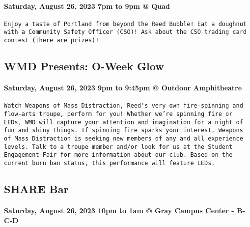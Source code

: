 \documentclass[
]{article}
\begin{document}
\hypertarget{saturday-august-26-2023-7pm-to-9pm-quad}{%
\paragraph{Saturday, August 26, 2023 7pm to 9pm @
Quad}\label{saturday-august-26-2023-7pm-to-9pm-quad}}

\begin{verbatim}
Enjoy a taste of Portland from beyond the Reed Bubble! Eat a doughnut with a Community Safety Officer (CSO)! Ask about the CSO trading card contest (there are prizes)!
\end{verbatim}

\hypertarget{wmd-presents-o-week-glow}{%
\subsection{WMD Presents: O-Week Glow}\label{wmd-presents-o-week-glow}}

\hypertarget{saturday-august-26-2023-9pm-to-945pm-outdoor-amphitheatre}{%
\paragraph{Saturday, August 26, 2023 9pm to 9:45pm @ Outdoor
Amphitheatre}\label{saturday-august-26-2023-9pm-to-945pm-outdoor-amphitheatre}}

\begin{verbatim}
Watch Weapons of Mass Distraction, Reed's very own fire-spinning and flow-arts troupe, perform for you! Whether we’re spinning fire or LEDs, WMD will capture your attention and imagination for a night of fun and shiny things. If spinning fire sparks your interest, Weapons of Mass Distraction is seeking new members of any and all experience levels. Talk to a troupe member and/or look for us at the Student Engagement Fair for more information about our club. Based on the current burn ban status, this performance will feature LEDs.
\end{verbatim}

\hypertarget{share-bar}{%
\subsection{SHARE Bar}\label{share-bar}}

\hypertarget{saturday-august-26-2023-10pm-to-1am-gray-campus-center---b-c-d}{%
\paragraph{Saturday, August 26, 2023 10pm to 1am @ Gray Campus Center -
B-C-D}\label{saturday-august-26-2023-10pm-to-1am-gray-campus-center---b-c-d}}
\end{document}
